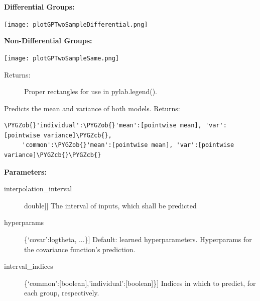 \documentclass[letterpaper,10pt,english]{sphinxmanual}
\def\PYGZob{\char`\{}
\def\PYGZcb{\char`\}}
\begin{document}
\begin{fulllineitems}
\begin{fulllineitems}
\begin{description}
\end{description}

\textbf{Differential Groups:}

\texttt{[image: plotGPTwoSampleDifferential.png]}

\textbf{Non-Differential Groups:}

\texttt{[image: plotGPTwoSampleSame.png]}
\begin{description}
\item[{Returns:}] \leavevmode
Proper rectangles for use in pylab.legend().

\end{description}

\end{fulllineitems}


\begin{fulllineitems}
\label{base:gptwosample.twosample.twosample_base.TwoSampleBase.predict_mean_variance}
Predicts the mean and variance of both models.
Returns:

\begin{Verbatim}[commandchars=\\\{\}]
\PYGZob{}'individual':\PYGZob{}'mean':[pointwise mean], 'var':[pointwise variance]\PYGZcb{},
     'common':\PYGZob{}'mean':[pointwise mean], 'var':[pointwise variance]\PYGZcb{}\PYGZcb{}
\end{Verbatim}

\textbf{Parameters:}
\begin{description}
\item[{interpolation\_interval}] \leavevmode{[}{[}double{]}{]}
The interval of inputs, which shall be predicted

\item[{hyperparams}] \leavevmode{[}\{`covar':logtheta, ...\}{]}
Default: learned hyperparameters. Hyperparams for the covariance function's prediction.

\item[{interval\_indices}] \leavevmode{[}\{`common':{[}boolean{]},'individual':{[}boolean{]}\}{]}
Indices in which to predict, for each group, respectively.

\end{description}


\end{fulllineitems}
\end{fulllineitems}
\end{document}
